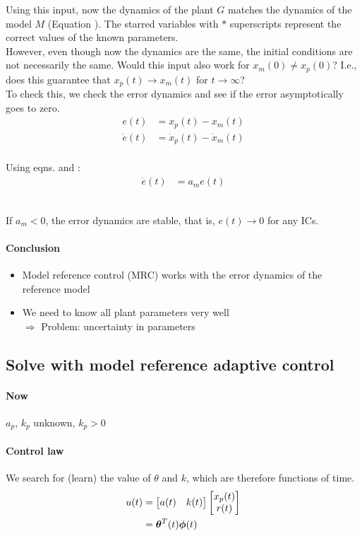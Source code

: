 Using this input, now the dynamics of the plant $G$ matches the dynamics
of the model $M$ (Equation ). 
The starred variables with $*$ superscripts represent
the correct values of the known parameters.\\

However, even though now the dynamics are the same,
the initial conditions are not necessarily the same.
Would this input also work for $x_m(0) \neq x_p(0)$?
I.e., does this guarantee that $x_p(t) \rightarrow x_m(t)$ for $t \rightarrow \infty$?\\

To check this, we check the error dynamics
and see if the error asymptotically goes to zero.
\begin{align*}
e(t) &= x_p(t) - x_m(t)\\
\dot{e}(t) &= \dot{x}_p(t) - \dot{x}_m(t)\\
\end{align*}

Using eqns.  and :
\begin{align}
\dot{e}(t)    &= a_m e(t)
\label{eq:error-dynamics}
\end{align}~

If $a_m <0$, the error dynamics are stable, that is,
$e(t) \rightarrow 0$ for any ICs.

\paragraph{Conclusion}
\begin{itemize}
\item Model reference control (MRC) works with the error dynamics of the
    reference model
\item We need to know all plant parameters very well \\
    $\Rightarrow$ Problem: uncertainty in parameters
\end{itemize}


\subsection{Solve with model reference adaptive control}
\paragraph{Now}
$a_p$, $k_p$ unknown, $k_p>0$

\paragraph{Control law}
We search for (learn) the value of $\theta$ and $k$,
which are therefore functions of time.
\begin{alignat*}{3}
u(t)    %
        &= \matr{a(t) & k(t)} \matr{x_p(t) \\ r(t)}\\
        &= \bm{\theta}^T(t)  \bm{\phi}(t)
\label{eq:u-linear}
\end{alignat*}


